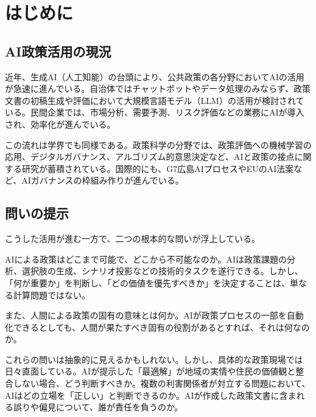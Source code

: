 \documentclass{keikaku}
\begin{document}
\maketitle

\section{はじめに}

\subsection{AI政策活用の現況}

近年、生成AI（人工知能）の台頭により、公共政策の各分野においてAIの活用が急速に進んでいる。自治体ではチャットボットやデータ処理のみならず、政策文書の初稿生成や評価において大規模言語モデル（LLM）の活用が検討されている\cite{soumu2022}。民間企業では、市場分析、需要予測、リスク評価などの業務にAIが導入され、効率化が進んでいる。

この流れは学界でも同様である。政策科学の分野では、政策評価への機械学習の応用\cite{barocas2019}、デジタルガバナンス\cite{kozuka2019}、アルゴリズム的意思決定\cite{shneiderman2022}など、AIと政策の接点に関する研究が蓄積されている。国際的にも、G7広島AIプロセス\cite{ema2024}やEUのAI法案など、AIガバナンスの枠組み作りが進んでいる。

\subsection{問いの提示}

こうした活用が進む一方で、二つの根本的な問いが浮上している。

AIによる政策はどこまで可能で、どこから不可能なのか。AIは政策課題の分析、選択肢の生成、シナリオ投影などの技術的タスクを遂行できる。しかし、「何が重要か」を判断し、「どの価値を優先すべきか」を決定することは、単なる計算問題ではない。

また、人間による政策の固有の意味とは何か。AIが政策プロセスの一部を自動化できるとしても、人間が果たすべき固有の役割があるとすれば、それは何なのか。

これらの問いは抽象的に見えるかもしれない。しかし、具体的な政策現場では日々直面している。AIが提示した「最適解」が地域の実情や住民の価値観と整合しない場合、どう判断すべきか。複数の利害関係者が対立する問題において、AIはどの立場を「正しい」と判断できるのか。AIが作成した政策文書に含まれる誤りや偏見について、誰が責任を負うのか。
\end{document}

